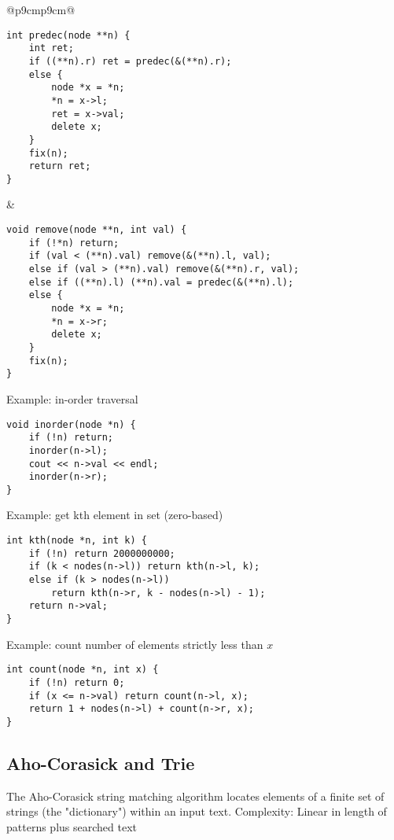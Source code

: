 \documentclass[letterpaper]{article}
\begin{document}
\begin{tabular}{@{}p{9cm}p{9cm}@{}}
\begin{lstlisting}
int predec(node **n) {
	int ret;
	if ((**n).r) ret = predec(&(**n).r);
	else {
		node *x = *n;
		*n = x->l;
		ret = x->val;
		delete x;
	}
	fix(n);
	return ret;
}
\end{lstlisting}
&
\begin{lstlisting}
void remove(node **n, int val) {
	if (!*n) return;
	if (val < (**n).val) remove(&(**n).l, val);
	else if (val > (**n).val) remove(&(**n).r, val);
	else if ((**n).l) (**n).val = predec(&(**n).l);
	else {
		node *x = *n;
		*n = x->r;
		delete x;
	}
	fix(n);
}
\end{lstlisting}
Example: in-order traversal
\begin{lstlisting}
void inorder(node *n) {
	if (!n) return;
	inorder(n->l);
	cout << n->val << endl;
	inorder(n->r);
}
\end{lstlisting}
Example: get kth element in set (zero-based)
\begin{lstlisting}
int kth(node *n, int k) {
	if (!n) return 2000000000;
	if (k < nodes(n->l)) return kth(n->l, k);
	else if (k > nodes(n->l))
		return kth(n->r, k - nodes(n->l) - 1);
	return n->val;
}
\end{lstlisting}
Example: count number of elements strictly less than $x$
\begin{lstlisting}
int count(node *n, int x) {
	if (!n) return 0;
	if (x <= n->val) return count(n->l, x);
	return 1 + nodes(n->l) + count(n->r, x);
}
\end{lstlisting}
\end{tabular}

\subsection{Aho-Corasick and Trie}

The Aho-Corasick string matching algorithm locates elements of a finite set of strings (the "dictionary") within an input text. Complexity: Linear in length of patterns plus searched text
\end{document}
